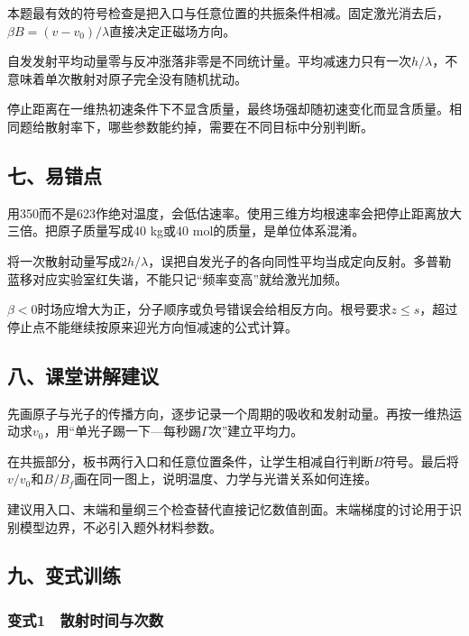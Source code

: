 \documentclass[12pt,a4paper,fontset=fandol]{ctexart}
\begin{document}
本题最有效的符号检查是把入口与任意位置的共振条件相减。固定激光消去后，\(\beta B=(v-v_0)/\lambda\)直接决定正磁场方向。

自发发射平均动量零与反冲涨落非零是不同统计量。平均减速力只有一次\(h/\lambda\)，不意味着单次散射对原子完全没有随机扰动。

停止距离在一维热初速条件下不显含质量，最终场强却随初速变化而显含质量。相同题给散射率下，哪些参数能约掉，需要在不同目标中分别判断。

\subsection{七、易错点}\label{ux4e03ux6613ux9519ux70b9-4}

用350而不是623作绝对温度，会低估速率。使用三维方均根速率会把停止距离放大三倍。把原子质量写成40
kg或40 mol的质量，是单位体系混淆。

将一次散射动量写成\(2h/\lambda\)，误把自发光子的各向同性平均当成定向反射。多普勒蓝移对应实验室红失谐，不能只记``频率变高''就给激光加频。

\(\beta<0\)时场应增大为正，分子顺序或负号错误会给相反方向。根号要求\(z\leq s\)，超过停止点不能继续按原来迎光方向恒减速的公式计算。

\subsection{八、课堂讲解建议}\label{ux516bux8bfeux5802ux8bb2ux89e3ux5efaux8bae-4}

先画原子与光子的传播方向，逐步记录一个周期的吸收和发射动量。再按一维热运动求\(v_0\)，用``单光子踢一下---每秒踢\(\Gamma\)次''建立平均力。

在共振部分，板书两行入口和任意位置条件，让学生相减自行判断\(B\)符号。最后将\(v/v_0\)和\(B/B_f\)画在同一图上，说明温度、力学与光谱关系如何连接。

建议用入口、末端和量纲三个检查替代直接记忆数值剖面。末端梯度的讨论用于识别模型边界，不必引入题外材料参数。

\subsection{九、变式训练}\label{ux4e5dux53d8ux5f0fux8badux7ec3-4}

\subsubsection{变式1　散射时间与次数}\label{ux53d8ux5f0f1-ux6563ux5c04ux65f6ux95f4ux4e0eux6b21ux6570}
\end{document}
